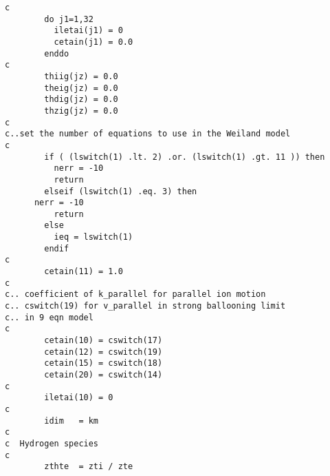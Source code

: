 \begin{verbatim}
c
        do j1=1,32
          iletai(j1) = 0
          cetain(j1) = 0.0
        enddo
c
        thiig(jz) = 0.0
        theig(jz) = 0.0
        thdig(jz) = 0.0
        thzig(jz) = 0.0
c
c..set the number of equations to use in the Weiland model
c
        if ( (lswitch(1) .lt. 2) .or. (lswitch(1) .gt. 11 )) then
          nerr = -10
          return
        elseif (lswitch(1) .eq. 3) then
	  nerr = -10
          return
        else
          ieq = lswitch(1)
        endif
c
        cetain(11) = 1.0
c
c.. coefficient of k_parallel for parallel ion motion
c.. cswitch(19) for v_parallel in strong ballooning limit
c.. in 9 eqn model
c
        cetain(10) = cswitch(17)
        cetain(12) = cswitch(19)
        cetain(15) = cswitch(18)
        cetain(20) = cswitch(14)
c
        iletai(10) = 0
c
        idim   = km
c
c  Hydrogen species
c
        zthte  = zti / zte


\end{verbatim}

